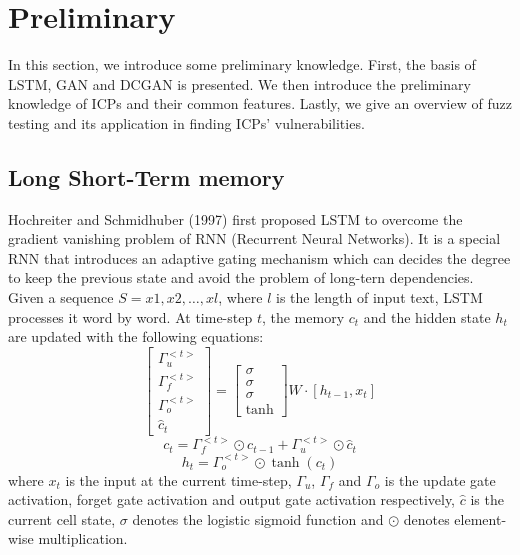 \section{Preliminary}
In this section, we introduce some preliminary knowledge. First, the basis of LSTM, GAN and DCGAN is presented.  We then introduce the preliminary knowledge of ICPs and their common features. Lastly, we give an overview of fuzz testing and its application in finding ICPs' vulnerabilities.

\subsection{Long Short-Term memory}
Hochreiter and Schmidhuber (1997) first proposed LSTM to overcome the gradient vanishing problem of RNN (Recurrent Neural Networks). It is a special RNN that introduces an adaptive gating mechanism which can decides the degree to keep the previous state and avoid the problem of long-tern dependencies. Given a sequence $S = {x1, x2, …, xl}$, where $l$ is the length of input text, LSTM processes it word by word. At time-step $t$, the memory $c_{t}$ and the hidden state $h_{t}$ are updated with the following equations:
\begin{equation}
\left[ \begin{array}{c}
\Gamma _u^{ < t > }\\
\Gamma _f^{ < t > }\\
\Gamma _o^{ < t > }\\
{{\hat c}_t}
\end{array} \right] = \left[ \begin{array}{c}
\sigma \\
\sigma \\
\sigma \\
\tanh 
\end{array} \right]W \cdot \left[ {{h_{t - 1}},{x_t}} \right]
\end{equation}
\begin{equation}
{c_t} = \Gamma _f^{ < t > } \odot {c_{t - 1}} + \Gamma _u^{ < t > } \odot {\hat c_t}
\end{equation}
\begin{equation}
{h_t} = \Gamma _o^{ < t > } \odot \tanh ({c_t})
\end{equation}
where $x_{t}$ is the input at the current time-step, $\Gamma _u$, $\Gamma _f$ and $\Gamma _o$ is the update gate activation, forget gate activation and output gate activation respectively, $\hat{c}$ is the current cell state, $\sigma$ denotes the logistic sigmoid function and $\odot$ denotes element-wise multiplication.


